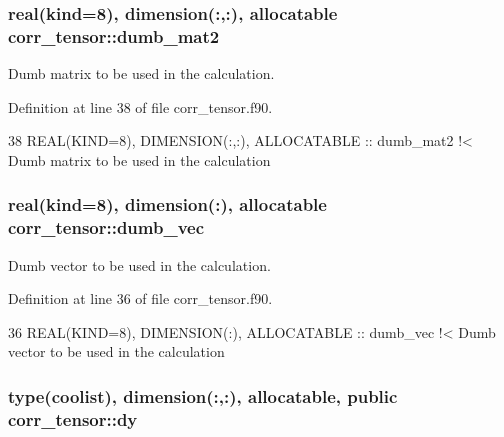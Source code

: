 \subsubsection[{\texorpdfstring{dumb\+\_\+mat2}{dumb_mat2}}]{\setlength{\rightskip}{0pt plus 5cm}real(kind=8), dimension(\+:,\+:), allocatable corr\+\_\+tensor\+::dumb\+\_\+mat2\hspace{0.3cm}{\ttfamily [private]}}\hypertarget{namespacecorr__tensor_ad46767b09e31f58c53a5a27b12709e30}{}\label{namespacecorr__tensor_ad46767b09e31f58c53a5a27b12709e30}


Dumb matrix to be used in the calculation. 



Definition at line 38 of file corr\+\_\+tensor.\+f90.


\begin{DoxyCode}
38   \textcolor{keywordtype}{REAL(KIND=8)}, \textcolor{keywordtype}{DIMENSION(:,:)}, \textcolor{keywordtype}{ALLOCATABLE} :: dumb\_mat2\textcolor{comment}{ !< Dumb matrix to be used in the calculation}
\end{DoxyCode}
\subsubsection[{\texorpdfstring{dumb\+\_\+vec}{dumb_vec}}]{\setlength{\rightskip}{0pt plus 5cm}real(kind=8), dimension(\+:), allocatable corr\+\_\+tensor\+::dumb\+\_\+vec\hspace{0.3cm}{\ttfamily [private]}}\hypertarget{namespacecorr__tensor_ad86b86fa1ec05686a778ab6b19273a38}{}\label{namespacecorr__tensor_ad86b86fa1ec05686a778ab6b19273a38}


Dumb vector to be used in the calculation. 



Definition at line 36 of file corr\+\_\+tensor.\+f90.


\begin{DoxyCode}
36   \textcolor{keywordtype}{REAL(KIND=8)}, \textcolor{keywordtype}{DIMENSION(:)}, \textcolor{keywordtype}{ALLOCATABLE} :: dumb\_vec\textcolor{comment}{ !< Dumb vector to be used in the calculation}
\end{DoxyCode}
\subsubsection[{\texorpdfstring{dy}{dy}}]{\setlength{\rightskip}{0pt plus 5cm}type({\bf coolist}), dimension(\+:,\+:), allocatable, public corr\+\_\+tensor\+::dy}\hypertarget{namespacecorr__tensor_a9bb5cad0b648cdfbca5d32eac1b73976}{}\label{namespacecorr__tensor_a9bb5cad0b648cdfbca5d32eac1b73976}


